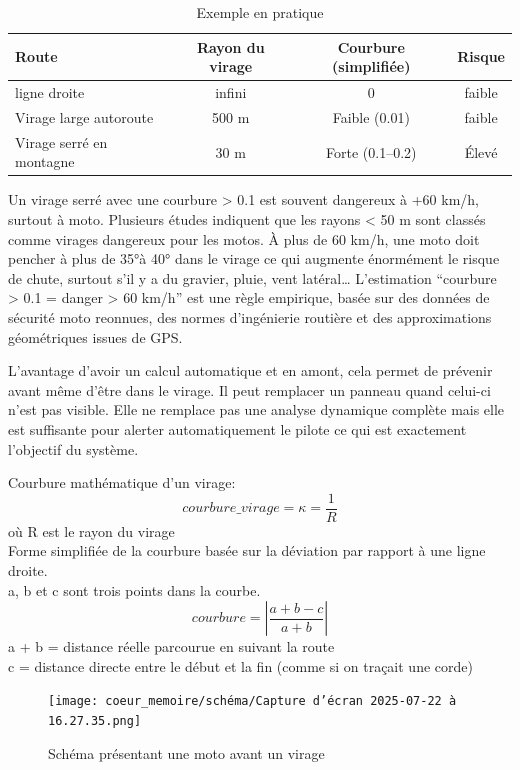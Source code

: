 \begin{table}[ht]
\centering
\begin{tabular}{|l|c|c|c|}
\hline
Route & Rayon du virage & Courbure (simplifiée) & Risque \\
\hline
ligne droite & infini & 0 & faible \\
Virage large autoroute & 500 m & Faible (0.01) & faible \\
Virage serré en montagne & 30 m & Forte (0.1–0.2) & Élevé \\
\hline
\end{tabular}
\caption{Exemple en pratique}
\end{table}

Un virage serré avec une courbure > 0.1 est souvent dangereux à +60 km/h, surtout à moto.
Plusieurs études indiquent que les rayons < 50 m sont classés comme virages dangereux pour les motos. À plus de 60 km/h, une moto doit pencher à plus de 35°à 40° dans le virage ce qui augmente énormément le risque de chute, surtout s’il y a du gravier, pluie, vent latéral…
L’estimation “courbure > 0.1 = danger > 60 km/h” est une règle empirique, basée sur des données de sécurité moto reonnues, des normes d'ingénierie routière et des approximations géométriques issues de GPS.


L'avantage d'avoir un calcul automatique et en amont, cela permet de prévenir avant même d'être dans le virage. Il peut remplacer un panneau quand celui-ci n'est pas visible. Elle ne remplace pas une analyse dynamique complète mais elle est suffisante pour alerter automatiquement le pilote ce qui est exactement l’objectif du système.



\begin{tcolorbox}[title=Calcul de la courbure]
Courbure mathématique\cite{formule_curvature} d’un virage:
\[
courbure\_virage = \kappa = \frac{1}{R}
\]
où R est le rayon du virage\\
Forme simplifiée de la courbure basée sur la déviation par rapport à une ligne droite.\\
a, b et c sont trois points dans la courbe.\\
\[
courbure = \left| \frac{a + b - c}{a + b} \right|
\]
a + b = distance réelle parcourue en suivant la route \\
c = distance directe entre le début et la fin (comme si on traçait une corde)
\end{tcolorbox}

\begin{figure}[H]
    \centering
    \texttt{[image: coeur\_memoire/schéma/Capture d’écran 2025-07-22 à 16.27.35.png]} 
    \caption{Schéma présentant une moto avant un virage}
\end{figure}


